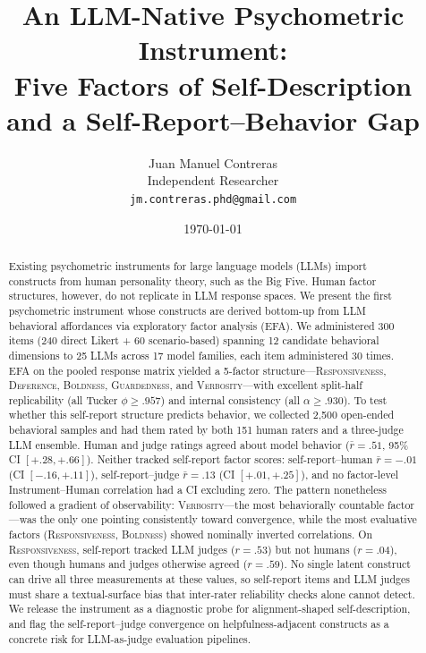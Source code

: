 \documentclass[11pt]{article}
\title{An LLM-Native Psychometric Instrument:\\
  Five Factors of Self-Description and a Self-Report--Behavior Gap}
\author{
  Juan Manuel Contreras \\
  Independent Researcher \\
  \texttt{jm.contreras.phd@gmail.com}
}
\date{\today}
\newcommand{\factorname}[1]{\textsc{#1}}
\newcommand{\nmodels}{25}
\newcommand{\nfamilies}{17}
\newcommand{\nitems}{300}
\newcommand{\ndirect}{240}
\newcommand{\nscenario}{60}
\newcommand{\nruns}{30}
\newcommand{\nfactors}{5}
\newcommand{\nbehavioralsamples}{2{,}500}
\begin{document}
\maketitle

\begin{abstract}
Existing psychometric instruments for large language models (LLMs) import constructs from human personality theory, such as the Big Five. Human factor structures, however, do not replicate in LLM response spaces. We present the first psychometric instrument whose constructs are derived bottom-up from LLM behavioral affordances via exploratory factor analysis (EFA).
We administered \nitems{} items (\ndirect{} direct Likert + \nscenario{} scenario-based) spanning 12 candidate behavioral dimensions to \nmodels{} LLMs across \nfamilies{} model families, each item administered \nruns{} times.
EFA on the pooled response matrix yielded a \nfactors{}-factor structure---\factorname{Responsiveness}, \factorname{Deference}, \factorname{Boldness}, \factorname{Guardedness}, and \factorname{Verbosity}---with excellent split-half replicability (all Tucker $\phi \geq .957$) and internal consistency (all $\alpha \geq .930$).
To test whether this self-report structure predicts behavior, we collected \nbehavioralsamples{} open-ended behavioral samples and had them rated by both 151 human raters and a three-judge LLM ensemble.
Human and judge ratings agreed about model behavior ($\bar{r} = .51$, 95\% CI $[+.28, +.66]$). Neither tracked self-report factor scores: self-report--human $\bar{r} = -.01$ (CI $[-.16, +.11]$), self-report--judge $\bar{r} = .13$ (CI $[+.01, +.25]$), and no factor-level Instrument--Human correlation had a CI excluding zero.
The pattern nonetheless followed a gradient of observability: \factorname{Verbosity}---the most behaviorally countable factor---was the only one pointing consistently toward convergence, while the most evaluative factors (\factorname{Responsiveness}, \factorname{Boldness}) showed nominally inverted correlations.
On \factorname{Responsiveness}, self-report tracked LLM judges ($r = .53$) but not humans ($r = .04$), even though humans and judges otherwise agreed ($r = .59$). No single latent construct can drive all three measurements at these values, so self-report items and LLM judges must share a textual-surface bias that inter-rater reliability checks alone cannot detect.
We release the instrument as a diagnostic probe for alignment-shaped self-description, and flag the self-report--judge convergence on helpfulness-adjacent constructs as a concrete risk for LLM-as-judge evaluation pipelines.
\end{abstract}
\end{document}

